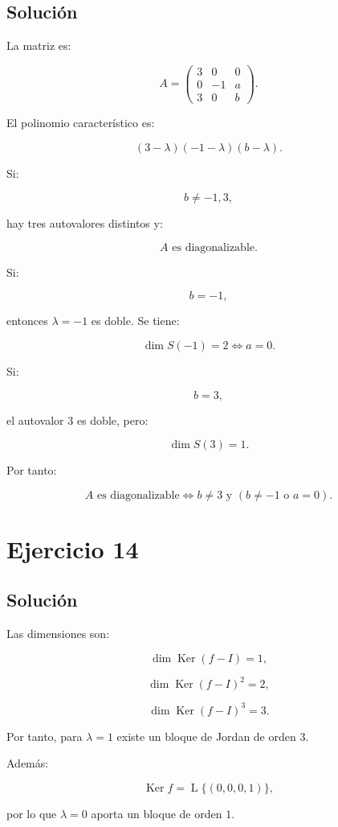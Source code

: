 \documentclass[11pt,a4paper]{article}
\newcommand{\Ker}{\operatorname{Ker}}
\newcommand{\Span}{\operatorname{L}}
\begin{document}
\subsection{Solución}

La matriz es:

\[
A=
\begin{pmatrix}
3&0&0\\
0&-1&a\\
3&0&b
\end{pmatrix}.
\]

El polinomio característico es:

\[
(3-\lambda)(-1-\lambda)(b-\lambda).
\]

Si:

\[
b\neq-1,3,
\]

hay tres autovalores distintos y:

\[
A\text{ es diagonalizable.}
\]

Si:

\[
b=-1,
\]

entonces $\lambda=-1$ es doble. Se tiene:

\[
\dim S(-1)=2
\iff
a=0.
\]

Si:

\[
b=3,
\]

el autovalor $3$ es doble, pero:

\[
\dim S(3)=1.
\]

Por tanto:

\[
\boxed{
A\text{ es diagonalizable}
\iff
b\neq3
\text{ y }
(b\neq-1\text{ o }a=0).
}
\]

\section{Ejercicio 14}
\subsection{Solución}

Las dimensiones son:

\[
\dim\Ker(f-I)=1,
\]

\[
\dim\Ker(f-I)^2=2,
\]

\[
\dim\Ker(f-I)^3=3.
\]

Por tanto, para $\lambda=1$ existe un bloque de Jordan de orden $3$.

Además:

\[
\Ker f=\Span\{(0,0,0,1)\},
\]

por lo que $\lambda=0$ aporta un bloque de orden $1$.
\end{document}
